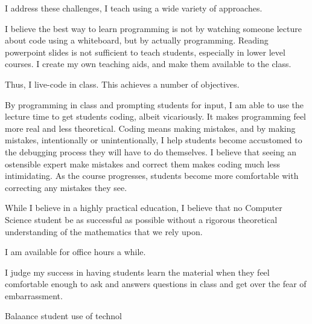 \documentclass[10pt, a4paper]{article}
\begin{document}
I address these challenges, I teach using a wide variety of approaches.

I believe the best way to learn programming is not by watching someone lecture about code using a whiteboard, but by actually programming.
Reading powerpoint slides is not sufficient to teach students, especially in lower level courses.
I create my own teaching aids, and make them available to the class.

Thus, I live-code in class.
This achieves a number of objectives.

By programming in class and prompting students for input, I am able to use the lecture time to get students coding, albeit vicariously.
It makes programming feel more real and less theoretical.
Coding means making mistakes, and by making mistakes, intentionally or unintentionally, I help students become accustomed to the debugging process they will have to do themselves.
I believe that seeing an ostensible expert make mistakes and correct them makes coding much less intimidating.
As the course progresses, students become more comfortable with correcting any mistakes they see.


While I believe in a highly practical education, I believe that no Computer Science student be as successful as possible without a rigorous theoretical understanding of the mathematics that we rely upon.

























I am available for office hours a while.


I judge my success in having students learn the material when they feel comfortable enough to ask and  answers questions in class and get over the fear of embarrassment.


Balaance student use of technol
\end{document}
